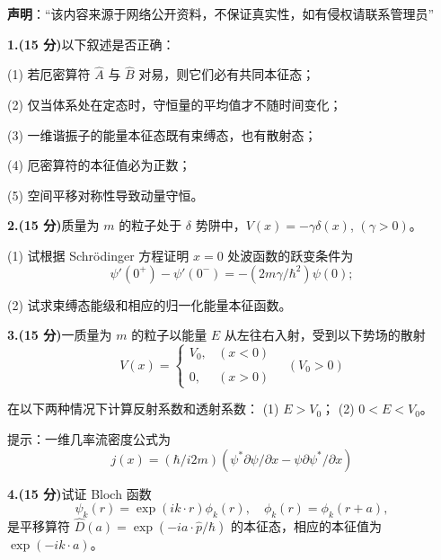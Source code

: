 
\textbf{声明}：“该内容来源于网络公开资料，不保证真实性，如有侵权请联系管理员”

\textbf{1.(15 分)}以下叙述是否正确：

(1) 若厄密算符 $\hat{A}$ 与 $\hat{B}$ 对易，则它们必有共同本征态；

(2) 仅当体系处在定态时，守恒量的平均值才不随时间变化；

(3) 一维谐振子的能量本征态既有束缚态，也有散射态；

(4) 厄密算符的本征值必为正数；

(5) 空间平移对称性导致动量守恒。

\textbf{2.(15 分)}质量为 $m$ 的粒子处于 $\delta$ 势阱中，$V(x) = -\gamma \delta(x)$, $(\gamma > 0)$。

(1) 试根据 Schrödinger 方程证明 $x=0$ 处波函数的跃变条件为
$$\psi'(0^+) - \psi'(0^-) = -\left(2m\gamma/\hbar^2\right)\psi(0);~$$

(2) 试求束缚态能级和相应的归一化能量本征函数。

\textbf{3.(15 分)}一质量为 $m$ 的粒子以能量 $E$ 从左往右入射，受到以下势场的散射
$$V(x) =\begin{cases} V_0, & (x < 0) \\\\0, & (x > 0) \end{cases}\quad (V_0 > 0)~$$

在以下两种情况下计算反射系数和透射系数：
(1) $E > V_0$；
(2) $0 < E < V_0$。

提示：一维几率流密度公式为 
$$j(x) = \left(\hbar/i2m\right)\left(\psi^* \partial \psi/\partial x - \psi \partial \psi^*/\partial x\right)~$$

\textbf{4.(15 分)}试证 Bloch 函数
$$\psi_k(r) = \exp(ik \cdot r)\phi_k(r), \quad \phi_k(r) = \phi_k(r + a),~$$
是平移算符 $\hat{D}(a) = \exp\left(-ia \cdot \hat{p}/\hbar\right)$ 的本征态，相应的本征值为 $\exp\left(-ik \cdot a\right)$。